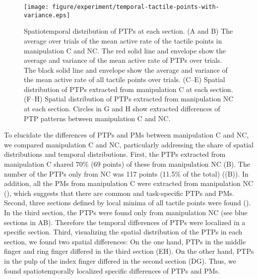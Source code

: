 \documentclass[letterpaper, 10 pt, conference]{IEEEtran}  %
\begin{document}
\begin{figure*}[t!]
 \centering
  \texttt{[image: figure/experiment/temporal-tactile-points-with-variance.eps]}
  \caption{Spatiotemporal distribution of PTPs at each section. (A and B) The average over trials of the mean active rate of the tactile points in manipulation C and NC. The red solid line and envelope show the average and variance of the mean active rate of PTPs over trials. The black solid line and envelope show the average and variance of the mean active rate of all tactile points over trials. (C--E) Spatial distribution of PTPs extracted from manipulation C at each section. (F--H) Spatial distribution of PTPs extracted from manipulation NC at each section. Circles in G and H show extracted differences of PTP patterns between manipulation C and NC.}
 \label{fig:temporal-tactile-points-with-variance}
\end{figure*}



To elucidate the differences of PTPs and PMs between manipulation C and NC, we compared manipulation C and NC, particularly addressing the share of spatial distributions and temporal distributions. First, the PTPs extracted from manipulation C shared 70\% (69 points) of these from manipulation NC (B). The number of the PTPs only from NC was 117 points (11.5\% of the total) ((B)). In addition, all the PMs from manipulation C were extracted from manipulation NC (), which suggests that there are common and task-specific PTPs and PMs. Second, three sections defined by local minima of all tactile points were found (). In the third section, the PTPs were found only from manipulation NC (see blue sections in AB). Therefore the temporal differences of PTPs were localized in a specific section. Third, visualizing the spatial distribution of the PTPs in each section, we found two spatial differences: On the one hand, PTPs in the middle finger and ring finger differed in the third section (EH). On the other hand, PTPs in the pulp of the index finger differed in the second section (DG). Thus, we found spatiotemporally localized specific differences of PTPs and PMs.
\end{document}
